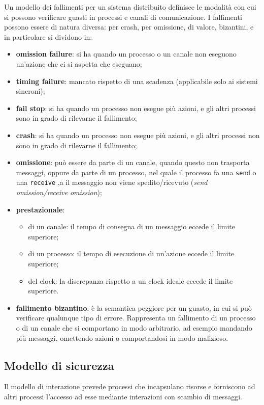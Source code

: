 Un modello dei fallimenti per un sistema distribuito definisce le modalità con cui si possono verificare guasti in processi e canali di comunicazione. I fallimenti possono essere di natura diversa: per crash, per omissione, di valore, bizantini, e in particolare si dividono in:
\begin{itemize}
    \item \textbf{omission failure}: si ha quando un processo o un canale non eseguono un'azione che ci si aspetta che eseguano;
    \item \textbf{timing failure}: mancato rispetto di una scadenza (applicabile solo ai sistemi sincroni);
    \item \textbf{fail stop}: si ha quando un processo non esegue più azioni, e gli altri processi sono in grado di rilevarne il fallimento;
    \item \textbf{crash}: si ha quando un processo non esegue più azioni, e gli altri processi non sono in grado di rilevarne il fallimento;
    \item \textbf{omissione}: può essere da parte di un canale, quando questo non trasporta messaggi, oppure da parte di un processo, nel quale il processo fa una \texttt{send} o una \texttt{receive} ,a il messaggio non viene spedito/ricevuto (\textit{send omission/receive omission});
    \item \textbf{prestazionale}:
    \begin{itemize}
        \item di un canale: il tempo di consegna di un messaggio eccede il limite superiore;
        \item di un processo: il tempo di esecuzione di un'azione eccede il limite superiore;
        \item del clock: la discrepanza rispetto a un clock ideale eccede il limite superiore. 
    \end{itemize}
    \item \textbf{fallimento bizantino}: è la semantica peggiore per un guasto, in cui si può verificare qualunque tipo di errore. Rappresenta un fallimento di un processo o di un canale che si comportano in modo arbitrario, ad esempio mandando più messaggi, omettendo azioni o comportandosi in modo malizioso.
\end{itemize}
\subsection{Modello di sicurezza}
Il modello di interazione prevede processi che incapsulano risorse e forniscono ad altri processi l'accesso ad esse mediante interazioni con scambio di messaggi.

